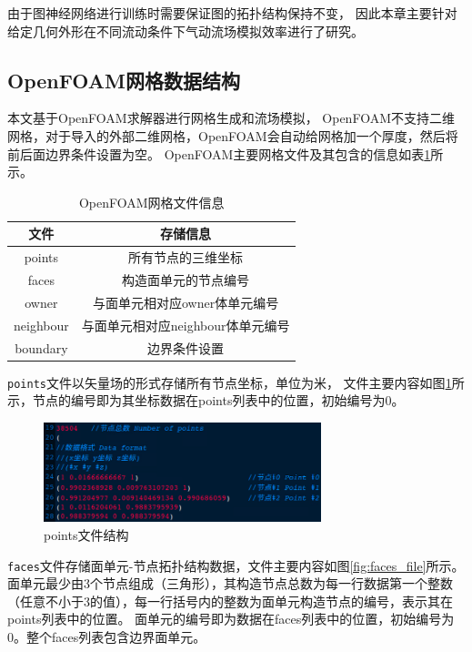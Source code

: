 由于图神经网络进行训练时需要保证图的拓扑结构保持不变，
因此本章主要针对给定几何外形在不同流动条件下气动流场模拟效率进行了研究。



\subsection{OpenFOAM网格数据结构}\label{meshstructure}
本文基于OpenFOAM求解器进行网格生成和流场模拟，
OpenFOAM不支持二维网格，对于导入的外部二维网格，OpenFOAM会自动给网格加一个厚度，然后将前后面边界条件设置为空。
OpenFOAM主要网格文件及其包含的信息如表\ref{tab:openfoammesh}所示。

\begin{table}[htp]
	\setlength{\belowcaptionskip}{0.0cm}
	\caption{OpenFOAM网格文件信息}
	\label{tab:openfoammesh}
	\centering
	\begin{tabular}{c|c}
		\toprule
		文件 & 存储信息\\
		\midrule
		points  & 所有节点的三维坐标\\
		\midrule
		faces & 构造面单元的节点编号\\
		\midrule
		owner & 与面单元相对应owner体单元编号\\
		\midrule
		neighbour & 与面单元相对应neighbour体单元编号\\
		\midrule
		boundary & 边界条件设置\\		
		\bottomrule
	\end{tabular}
\end{table}

\texttt{points}文件以矢量场的形式存储所有节点坐标，单位为米，
文件主要内容如图\ref{fig:points_file}所示，节点的编号即为其坐标数据在points列表中的位置，初始编号为0。

\begin{figure}[htp]
	\centering
	\includegraphics[width=0.72\textwidth]{./figures/points.png}
	\caption{points文件结构}
	\label{fig:points_file}	
\end{figure}

\texttt{faces}文件存储面单元-节点拓扑结构数据，文件主要内容如图\ref{fig:faces_file}所示。面单元最少由3个节点组成（三角形），其构造节点总数为每一行数据第一个整数（任意不小于3的值），每一行括号内的整数为面单元构造节点的编号，表示其在points列表中的位置。
面单元的编号即为数据在faces列表中的位置，初始编号为0。整个faces列表包含边界面单元。

